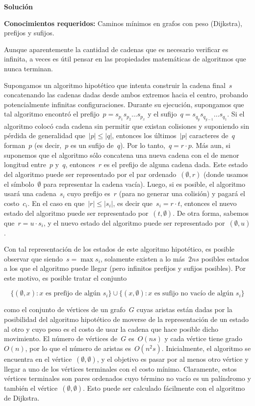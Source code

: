 \vspace*{0cm}
{\Large\textbf{Solución}}

\textbf{Conocimientos requeridos:} Caminos mínimos en grafos con peso (Dijkstra),
prefijos y sufijos.

Aunque aparentemente la cantidad de cadenas que es necesario verificar es infinita, a
veces es útil pensar en las propiedades matemáticas de algoritmos que nunca terminan.

Supongamos un algoritmo hipotético que intenta construir la cadena final~$s$
concatenando las cadenas dadas desde ambos extremos hacia el centro, probando
potencialmente infinitas configuraciones. Durante su ejecución, supongamos que tal
algoritmo encontró el prefijo~$p = s_{p_1}s_{p_2}\dots s_{p_x}$ y el
sufijo~$q = s_{q_y}s_{q_{y-1}}\dots s_{q_1}$. Si el algoritmo colocó cada cadena sin
permitir que existan colisiones y suponiendo sin pérdida de generalidad
que~$|p| \leq |q|$, entonces los últimos~$|p|$ caracteres de~$q$ forman~$p$ (es
decir,~$p$ es un sufijo de~$q$). Por lo tanto,~$q = r\cdot p$. Más aun, si suponemos
que el algoritmo sólo concatena una nueva cadena con el de menor longitud entre~$p$
y~$q$, entonces~$r$ es el prefijo de alguna cadena dada. Este estado del algoritmo
puede ser representado por el par ordenado~$(\emptyset, r)$ (donde usamos el
símbolo~$\emptyset$ para representar la cadena vacía). Luego, si es posible, el
algoritmo usará una cadena~$s_i$ cuyo prefijo es~$r$ (para no generar una colisión) y
pagará el costo~$c_i$. En el caso en que~$|r| \leq |s_i|$, es decir
que~$s_i = r \cdot t$, entonces el nuevo estado del algoritmo puede ser representado
por~$(t, \emptyset)$. De otra forma, sabemos que~$r = u \cdot s_i$, y el nuevo estado
del algoritmo puede ser representado por~$(\emptyset, u)$.

Con tal representación de los estados de este algoritmo hipotético, es posible
observar que siendo~$s = \max s_i$, solamente existen a lo más~$2ns$ posibles estados
a los que el algoritmo puede llegar (pero infinitos prefijos y sufijos posibles). Por
este motivo, es posible tratar el conjunto

\begin{equation*}
  \{(\emptyset, x): x \text{ es prefijo de algún } s_i\}
  \cup
  \{(x, \emptyset): x \text{ es sufijo no vacío de algún } s_i\}
\end{equation*}

como el conjunto de vértices de un grafo~$G$ cuyas aristas están dadas por la
posibilidad del algoritmo hipotético de moverse de la representación de un estado al
otro y cuyo peso es el costo de usar la cadena que hace posible dicho movimiento. El
número de vértices de~$G$ es~$O(n s)$ y cada vértice tiene grado~$O(n)$, por lo que
el número de aristas es~$O(n^2 s)$. Inicialmente, el algoritmo se encuentra en el
vértice~$(\emptyset, \emptyset)$, y el objetivo es pasar por al menos otro vértice y
llegar a uno de los vértices terminales con el costo mínimo. Claramente, estos
vértices terminales son pares ordenados cuyo término no vacío es un palíndromo y
también el vértice~$(\emptyset, \emptyset)$. Esto puede ser calculado fácilmente con
el algoritmo de Dijkstra.

